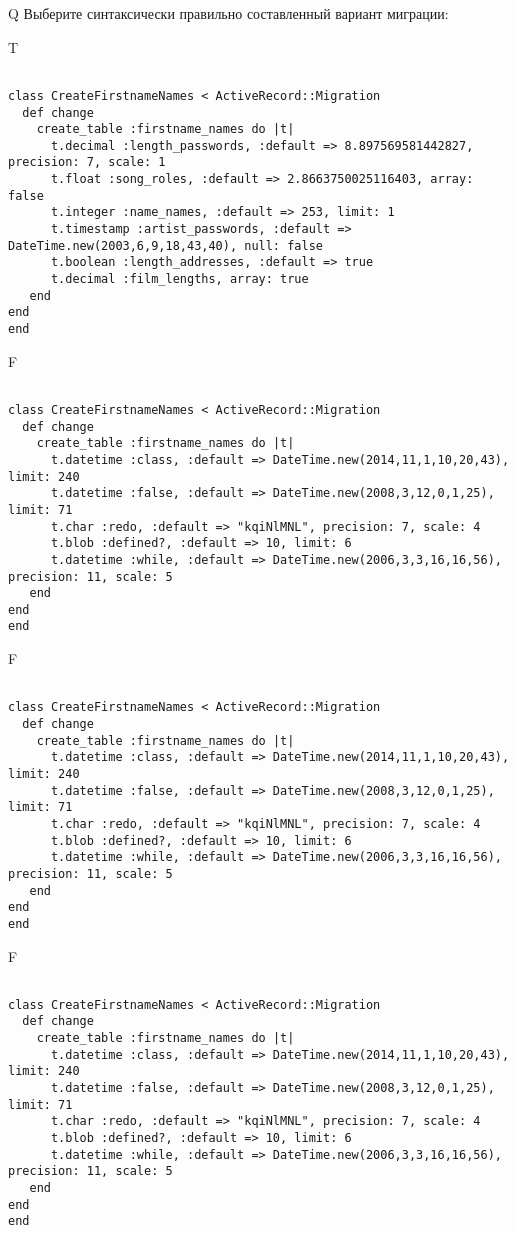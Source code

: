 Q
Выберите синтаксически правильно составленный вариант миграции:

T
\begin{verbatim}
		
class CreateFirstnameNames < ActiveRecord::Migration 
  def change 
    create_table :firstname_names do |t| 
      t.decimal :length_passwords, :default => 8.897569581442827, precision: 7, scale: 1
      t.float :song_roles, :default => 2.8663750025116403, array: false
      t.integer :name_names, :default => 253, limit: 1
      t.timestamp :artist_passwords, :default => DateTime.new(2003,6,9,18,43,40), null: false
      t.boolean :length_addresses, :default => true
      t.decimal :film_lengths, array: true
   end
end
end
\end{verbatim}

F
\begin{verbatim}
		
class CreateFirstnameNames < ActiveRecord::Migration 
  def change 
    create_table :firstname_names do |t| 
      t.datetime :class, :default => DateTime.new(2014,11,1,10,20,43), limit: 240
      t.datetime :false, :default => DateTime.new(2008,3,12,0,1,25), limit: 71
      t.char :redo, :default => "kqiNlMNL", precision: 7, scale: 4
      t.blob :defined?, :default => 10, limit: 6
      t.datetime :while, :default => DateTime.new(2006,3,3,16,16,56), precision: 11, scale: 5
   end
end
end
\end{verbatim}

F
\begin{verbatim}
		
class CreateFirstnameNames < ActiveRecord::Migration 
  def change 
    create_table :firstname_names do |t| 
      t.datetime :class, :default => DateTime.new(2014,11,1,10,20,43), limit: 240
      t.datetime :false, :default => DateTime.new(2008,3,12,0,1,25), limit: 71
      t.char :redo, :default => "kqiNlMNL", precision: 7, scale: 4
      t.blob :defined?, :default => 10, limit: 6
      t.datetime :while, :default => DateTime.new(2006,3,3,16,16,56), precision: 11, scale: 5
   end
end
end
\end{verbatim}

F
\begin{verbatim}
		
class CreateFirstnameNames < ActiveRecord::Migration 
  def change 
    create_table :firstname_names do |t| 
      t.datetime :class, :default => DateTime.new(2014,11,1,10,20,43), limit: 240
      t.datetime :false, :default => DateTime.new(2008,3,12,0,1,25), limit: 71
      t.char :redo, :default => "kqiNlMNL", precision: 7, scale: 4
      t.blob :defined?, :default => 10, limit: 6
      t.datetime :while, :default => DateTime.new(2006,3,3,16,16,56), precision: 11, scale: 5
   end
end
end
\end{verbatim}


